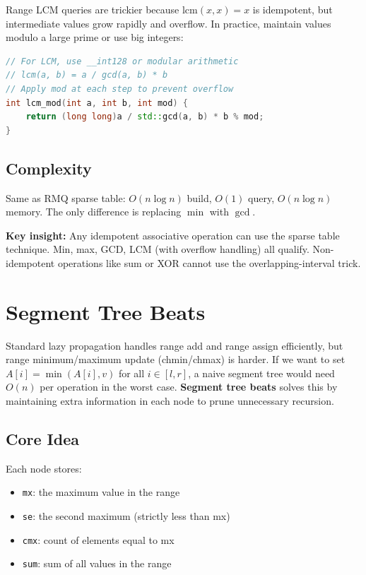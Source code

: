 Range LCM queries are trickier because $\text{lcm}(x, x) = x$ is idempotent, but intermediate values grow rapidly and overflow. In practice, maintain values modulo a large prime or use big integers:

\begin{lstlisting}[language=C++]
// For LCM, use __int128 or modular arithmetic
// lcm(a, b) = a / gcd(a, b) * b
// Apply mod at each step to prevent overflow
int lcm_mod(int a, int b, int mod) {
    return (long long)a / std::gcd(a, b) * b % mod;
}
\end{lstlisting}

\subsection{Complexity}

Same as RMQ sparse table: $O(n \log n)$ build, $O(1)$ query, $O(n \log n)$ memory. The only difference is replacing $\min$ with $\gcd$.

\textbf{Key insight:} Any idempotent associative operation can use the sparse table technique. Min, max, GCD, LCM (with overflow handling) all qualify. Non-idempotent operations like sum or XOR cannot use the overlapping-interval trick.

\section{Segment Tree Beats}

Standard lazy propagation handles range add and range assign efficiently, but range minimum/maximum update (chmin/chmax) is harder. If we want to set $A[i] = \min(A[i], v)$ for all $i \in [l, r]$, a naive segment tree would need $O(n)$ per operation in the worst case. \textbf{Segment tree beats} solves this by maintaining extra information in each node to prune unnecessary recursion.

\subsection{Core Idea}

Each node stores:
\begin{itemize}
\item \texttt{mx}: the maximum value in the range
\item \texttt{se}: the second maximum (strictly less than mx)
\item \texttt{cmx}: count of elements equal to mx
\item \texttt{sum}: sum of all values in the range
\end{itemize}

